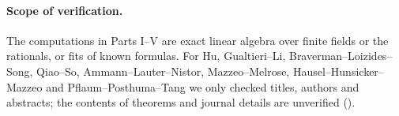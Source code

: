 \paragraph{Scope of verification.} The computations in Parts I--V are exact linear algebra over finite fields or the rationals, or fits of known formulas. For Hu, Gualtieri--Li, Braverman--Loizides--Song, Qiao--So, Ammann--Lauter--Nistor, Mazzeo--Melrose, Hausel--Hunsicker--Mazzeo and Pflaum--Posthuma--Tang we only checked titles, authors and abstracts; the contents of theorems and journal details are unverified (\tQ).



